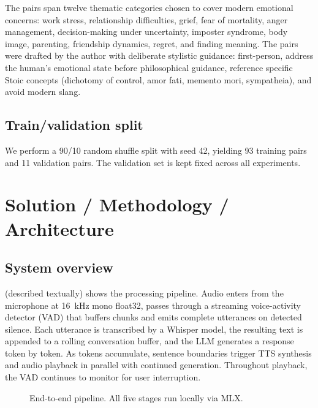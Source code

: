 \documentclass{ecsproject}
\begin{document}
The pairs span twelve thematic categories chosen to cover modern
emotional concerns: work stress, relationship difficulties, grief,
fear of mortality, anger management, decision-making under uncertainty,
imposter syndrome, body image, parenting, friendship dynamics, regret,
and finding meaning. The pairs were drafted by the author with
deliberate stylistic guidance: first-person, address the human's
emotional state before philosophical guidance, reference specific
Stoic concepts (dichotomy of control, amor fati, memento mori,
sympatheia), and avoid modern slang.

\section{Train/validation split}
We perform a 90/10 random shuffle split with seed 42, yielding 93
training pairs and 11 validation pairs. The validation set is kept
fixed across all experiments.

\chapter{Solution / Methodology / Architecture}
\label{Chapter:Methodology}

\section{System overview}
 (described textually) shows the processing pipeline.
Audio enters from the microphone at 16~kHz mono float32, passes
through a streaming voice-activity detector (VAD) that buffers chunks
and emits complete utterances on detected silence. Each utterance is
transcribed by a Whisper model, the resulting text is appended to a
rolling conversation buffer, and the LLM generates a response token by
token. As tokens accumulate, sentence boundaries trigger TTS synthesis
and audio playback in parallel with continued generation. Throughout
playback, the VAD continues to monitor for user interruption.

\begin{figure}[h]
\centering
{}
\caption{End-to-end pipeline. All five stages run locally via MLX.}
\label{fig:pipeline}
\end{figure}
\end{document}

